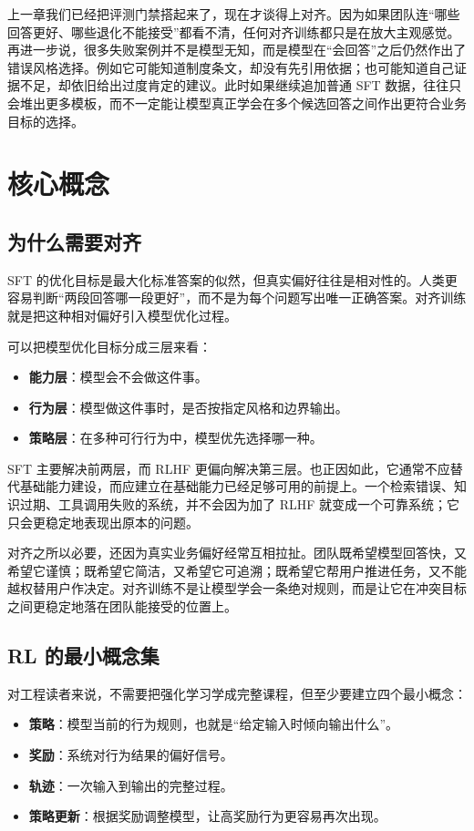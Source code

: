 上一章我们已经把评测门禁搭起来了，现在才谈得上对齐。因为如果团队连“哪些回答更好、哪些退化不能接受”都看不清，任何对齐训练都只是在放大主观感觉。再进一步说，很多失败案例并不是模型无知，而是模型在“会回答”之后仍然作出了错误风格选择。例如它可能知道制度条文，却没有先引用依据；也可能知道自己证据不足，却依旧给出过度肯定的建议。此时如果继续追加普通 SFT 数据，往往只会堆出更多模板，而不一定能让模型真正学会在多个候选回答之间作出更符合业务目标的选择。

\section{核心概念}
\subsection{为什么需要对齐}
SFT 的优化目标是最大化标准答案的似然，但真实偏好往往是相对性的。人类更容易判断“两段回答哪一段更好”，而不是为每个问题写出唯一正确答案。对齐训练就是把这种相对偏好引入模型优化过程。

可以把模型优化目标分成三层来看：
\begin{itemize}
  \item \textbf{能力层}：模型会不会做这件事。
  \item \textbf{行为层}：模型做这件事时，是否按指定风格和边界输出。
  \item \textbf{策略层}：在多种可行行为中，模型优先选择哪一种。
\end{itemize}

SFT 主要解决前两层，而 RLHF 更偏向解决第三层。也正因如此，它通常不应替代基础能力建设，而应建立在基础能力已经足够可用的前提上。一个检索错误、知识过期、工具调用失败的系统，并不会因为加了 RLHF 就变成一个可靠系统；它只会更稳定地表现出原本的问题。

对齐之所以必要，还因为真实业务偏好经常互相拉扯。团队既希望模型回答快，又希望它谨慎；既希望它简洁，又希望它可追溯；既希望它帮用户推进任务，又不能越权替用户作决定。对齐训练不是让模型学会一条绝对规则，而是让它在冲突目标之间更稳定地落在团队能接受的位置上。

\subsection{RL 的最小概念集}
对工程读者来说，不需要把强化学习学成完整课程，但至少要建立四个最小概念：
\begin{itemize}
  \item \textbf{策略}：模型当前的行为规则，也就是“给定输入时倾向输出什么”。
  \item \textbf{奖励}：系统对行为结果的偏好信号。
  \item \textbf{轨迹}：一次输入到输出的完整过程。
  \item \textbf{策略更新}：根据奖励调整模型，让高奖励行为更容易再次出现。
\end{itemize}

